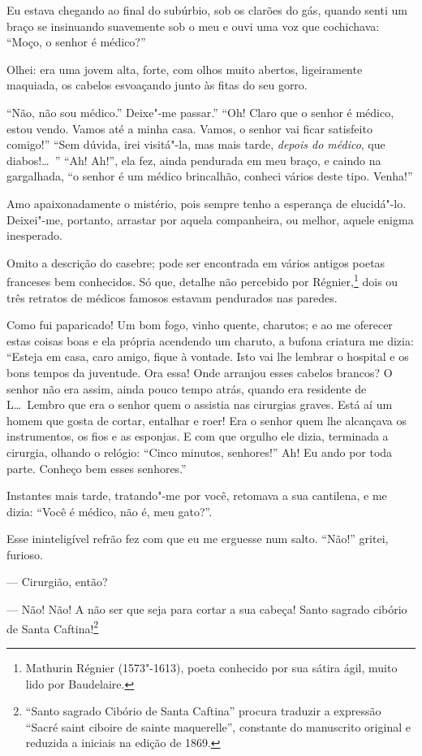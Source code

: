 Eu estava chegando ao final do subúrbio, sob os clarões do gás,
quando senti um braço se insinuando suavemente sob o meu e ouvi uma
voz que cochichava: “Moço, o senhor é
médico?''

Olhei: era uma jovem alta, forte, com olhos muito abertos, ligeiramente
maquiada, os cabelos esvoaçando junto às fitas do seu gorro.

“Não, não sou médico.'' Deixe"-me passar.'' “Oh! Claro que
o senhor é médico, estou vendo. Vamos até a minha casa. Vamos, o senhor vai ficar
satisfeito comigo!'' “Sem dúvida, irei visitá"-la, mas mais
tarde, \textit{depois do médico}, que diabos!\ldots\ '' “Ah! Ah!'', ela fez, ainda
pendurada em meu braço, e caindo na gargalhada, “o senhor é um médico
brincalhão, conheci vários deste tipo. Venha!''

Amo apaixonadamente o mistério, pois sempre tenho a esperança de
elucidá"-lo. Deixei"-me, portanto, arrastar por aquela companheira,
ou melhor, aquele enigma inesperado.

Omito a descrição do casebre; pode ser encontrada em vários antigos
poetas franceses bem conhecidos. Só que, detalhe não percebido por
Régnier,\protect\footnote{  Mathurin Régnier (1573"-1613), poeta conhecido por sua sátira ágil,
muito lido por Baudelaire.} dois ou três retratos de médicos famosos
estavam pendurados nas paredes.

Como fui paparicado! Um bom fogo, vinho quente, charutos; e ao me
oferecer estas coisas boas e ela própria acendendo um charuto, a bufona
criatura me dizia: “Esteja em casa, caro amigo, fique à
vontade. Isto vai lhe lembrar o hospital e os bons tempos da juventude. 
Ora essa! Onde arranjou esses
cabelos brancos? O senhor não era assim, ainda pouco tempo atrás,
quando era residente de L\ldots\  Lembro que era o senhor quem o assistia nas
cirurgias graves. Está aí um homem que gosta de cortar, entalhar e
roer! Era o senhor quem lhe alcançava os instrumentos, os fios e as
esponjas. E com que orgulho ele dizia, terminada a cirurgia,
olhando o relógio: “Cinco minutos,
senhores!'' Ah! Eu ando por toda parte. Conheço bem
esses senhores.''

Instantes mais tarde, tratando"-me por você, retomava a sua
cantilena, e me dizia: “Você é médico, não é, meu
gato?''.

Esse ininteligível refrão fez com que eu me erguesse num salto.
``Não!'' gritei, furioso.

--- Cirurgião, então?

--- Não! Não! A não ser que seja para cortar a sua cabeça! Santo
sagrado cibório de Santa Caftina!\protect\footnote{   ``Santo sagrado Cibório de Santa Caftina''
procura traduzir a expressão ``Sacré saint ciboire de
sainte maquerelle'', constante do manuscrito original e
reduzida a iniciais na edição de 1869.}


